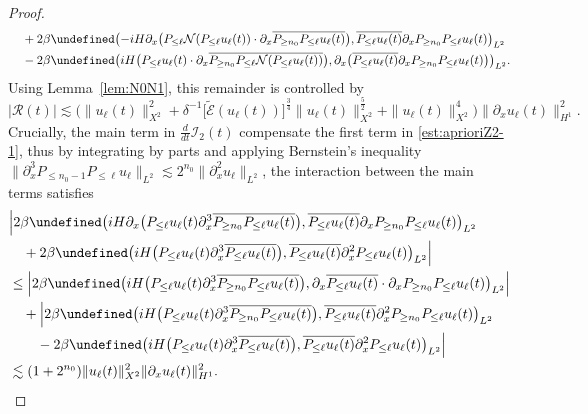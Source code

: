 \documentclass{amsart}
\numberwithin{equation}{section}
\let\Re=\undefined\DeclareMathOperator{\Re}{Re}
\begin{document}
\begin{proof}
$$\begin{aligned}
    &\quad +2\beta \Re \big( {-}iH\partial_x\big(P_{\leq \ell}\mathcal{N}(P_{\leq \ell}u_\ell(t))\cdot \partial_x\overline{P_{\geq n_0}P_{\leq \ell}u_\ell(t)}\big) ,\overline{P_{\leq \ell}u_\ell(t)}\partial_xP_{\geq n_0}P_{\leq \ell}u_\ell(t)\big)_{L^2} \\
    &\quad -2\beta \Re \big( iH\big(P_{\leq \ell}u_\ell(t)\cdot \partial_x\overline{P_{\geq n_0}P_{\leq \ell}\mathcal{N}(P_{\leq \ell}u_\ell(t))}\big) ,\partial_x\big( \overline{P_{\leq \ell}u_\ell(t)}\partial_xP_{\geq n_0}P_{\leq \ell}u_\ell(t)\big) \big)_{L^2} .
\end{aligned}$$
Using Lemma~\ref{lem:N0N1}, this remainder is controlled by
$$
    |\mathcal{R}(t)|\lesssim \Big( \| u_\ell(t) \|_{X^2}^2+\delta^{-1}\big[ \widetilde{\mathcal{E}}(u_\ell(t))\big] ^{\frac34}\| u_\ell(t) \|_{X^2}^{\frac52}+\| u_\ell(t) \|_{X^2}^4\Big) \| \partial_xu_\ell(t) \|_{H^1}^2. 
$$
Crucially, the main term in $\frac{d}{dt}\mathcal{I}_2(t)$ compensate the first term in \eqref{est:aprioriZ2-1}, thus by integrating by parts and applying Bernstein's inequality $\| \partial_x^3P_{\leq n_0-1}P_{\leq \ell}u_\ell \|_{L^2}\lesssim 2^{n_0}\| \partial_x^2u_\ell \|_{L^2}$, the interaction between the main terms satisfies
$$
\begin{aligned}
&\Big| 2\beta \Re \big( iH\partial_x\big(P_{\leq \ell}u_\ell(t) \partial_x^3\overline{P_{\geq n_0}P_{\leq \ell}u_\ell(t)}\big) ,\overline{P_{\leq \ell}u_\ell(t)}\partial_xP_{\geq n_0}P_{\leq \ell}u_\ell(t)\big)_{L^2} \\
&\quad + 2\beta \Re \big( iH\big(P_{\leq \ell}u_\ell(t)\partial_x^3\overline{P_{\leq \ell}u_\ell(t)}\big) ,\overline{P_{\leq \ell}u_\ell(t)}\partial_x^2P_{\leq \ell}u_\ell(t)\big)_{L^2} \Big| \\
&\leq \Big| 2\beta \Re \big( iH\big(P_{\leq \ell}u_\ell(t)\partial_x^3\overline{P_{\geq n_0}P_{\leq \ell}u_\ell(t)}\big) ,\partial_x\overline{P_{\leq \ell}u_\ell(t)}\cdot \partial_xP_{\geq n_0}P_{\leq \ell}u_\ell(t)\big)_{L^2} \Big| \\
&\quad +\Big| 2\beta \Re \big( iH\big(P_{\leq \ell}u_\ell(t)\partial_x^3\overline{P_{\geq n_0}P_{\leq \ell}u_\ell(t)}\big) ,\overline{P_{\leq \ell}u_\ell(t)}\partial_x^2P_{\geq n_0}P_{\leq \ell}u_\ell(t)\big)_{L^2} \\
&\quad\quad - 2\beta \Re \big( iH\big(P_{\leq \ell}u_\ell(t)\partial_x^3\overline{P_{\leq \ell}u_\ell(t)}\big) ,\overline{P_{\leq \ell}u_\ell(t)}\partial_x^2P_{\leq \ell}u_\ell(t)\big)_{L^2} \Big| \\
&\lesssim (1+2^{n_0})\| u_\ell(t) \|_{X^2}^2\| \partial_xu_\ell(t) \|_{H^1}^2.

\end{aligned}$$
\end{proof}
\end{document}
